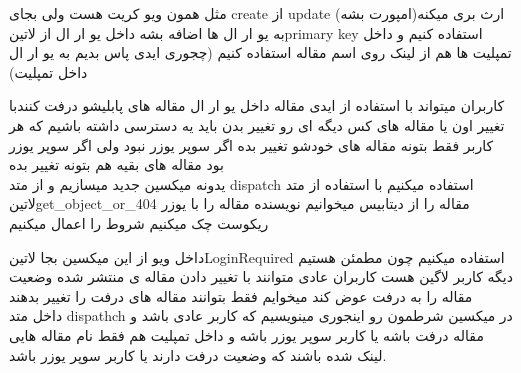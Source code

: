 \documentclass{article}
\begin{document}
		مثل همون ویو کریت هست ولی بجای create از update ارث بری میکنه(امپورت بشه) به یو ار ال ها اضافه بشه داخل یو ار ال از
		 ‌لاتین{primary key} استفاده کنیم و داخل تمپلیت ها هم از لینک روی اسم مقاله استفاده کنیم (چجوری ایدی پاس بدیم به یو ار ال داخل 
		 تمپلیت) 
	
	 کاربران میتواند با استفاده از ایدی مقاله داخل یو ار ال مقاله های پابلیشو درفت کنندبا تغییر اون یا مقاله های کس دیگه ای رو تغییر بدن
	 باید یه دسترسی داشته باشیم که هر کاربر فقط بتونه مقاله های خودشو تغییر بده اگر سوپر یوزر نبود ولی اگر سوپر یوزر بود مقاله های بقیه هم
	 بتونه تغییر بده\\
	 	 یدونه میکسین جدید میسازیم و از متد dispatch استفاده میکنیم
	 	 با استفاده از متد ‌لاتین{get\_object\_or\_404} مقاله را از دیتابیس میخوانیم
	 	 نویسنده مقاله را با یوزر ریکوست چک میکنیم 
	 	 شروط را اعمال میکنیم
	 	
	 	داخل ویو از این میکسین بجا ‌لاتین{LoginRequired} استفاده میکنیم چون مطمئن هستیم دیگه کاربر لاگین هست
	 کاربران عادی متوانند با تغییر دادن مقاله ی منتشر شده وضعیت مقاله را به درفت عوض کند میخوایم فقط بتوانند مقاله های درفت را تغییر
	 بدهند\\
	 	داخل متد dispathch در میکسین شرطمون رو اینجوری مینویسیم که کاربر عادی باشد و مقاله درفت باشه یا کاربر سوپر یوزر باشه و داخل
	 	تمپلیت هم فقط نام مقاله هایی لینک شده باشند که وضعیت درفت دارند یا کاربر سوپر یوزر باشد.
	 	
\end{document}
